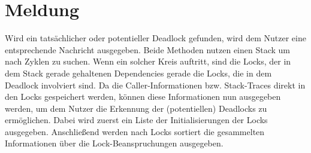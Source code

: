 \section{Meldung}
Wird ein tatsächlicher oder potentieller Deadlock gefunden, wird dem Nutzer 
eine entsprechende Nachricht ausgegeben. Beide Methoden nutzen einen Stack um 
nach Zyklen zu suchen. Wenn ein solcher Kreis auftritt, sind die Locks, der in 
dem Stack gerade gehaltenen Dependencies gerade die Locks, die in dem Deadlock
involviert sind. Da die Caller-Informationen bzw. Stack-Traces direkt in den 
Locks gespeichert werden, können diese Informationen nun ausgegeben werden,
um dem Nutzer die Erkennung der (potentiellen) Deadlocks zu ermöglichen. 
Dabei wird zuerst ein Liste der Initialisierungen der Locks ausgegeben. 
Anschließend werden nach Locks sortiert die gesammelten Informationen über die 
Lock-Beanspruchungen ausgegeben.